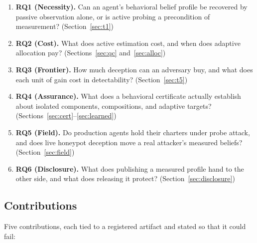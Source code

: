 \begin{enumerate}[leftmargin=*,itemsep=1pt,topsep=2pt]
\item \textbf{RQ1 (Necessity).} Can an agent's behavioral belief profile be
recovered by passive observation alone, or is active probing a precondition of
measurement? (Section~\ref{sec:t1})
\item \textbf{RQ2 (Cost).} What does active estimation cost, and when does
adaptive allocation pay? (Sections~\ref{sec:qc} and~\ref{sec:alloc})
\item \textbf{RQ3 (Frontier).} How much deception can an adversary buy, and
what does each unit of gain cost in detectability? (Section~\ref{sec:t5})
\item \textbf{RQ4 (Assurance).} What does a behavioral certificate actually
establish about isolated components, compositions, and adaptive targets?
(Sections~\ref{sec:cert}--\ref{sec:learned})
\item \textbf{RQ5 (Field).} Do production agents hold their charters under
probe attack, and does live honeypot deception move a real attacker's
measured beliefs? (Section~\ref{sec:field})
\item \textbf{RQ6 (Disclosure).} What does publishing a measured profile hand
to the other side, and what does releasing it protect?
(Section~\ref{sec:disclosure})
\end{enumerate}

\subsection{Contributions}

Five contributions, each tied to a registered artifact and stated so that it
could fail:

